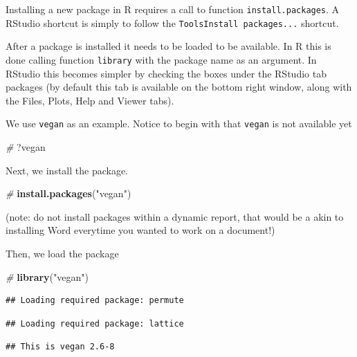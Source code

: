 \documentclass[
]{article}
\newenvironment{Shaded}{\begin{snugshade}}{\end{snugshade}}
\newcommand{\CommentTok}[1]{\textcolor[rgb]{0.56,0.35,0.01}{\textit{#1}}}
\newcommand{\FunctionTok}[1]{\textcolor[rgb]{0.13,0.29,0.53}{\textbf{#1}}}
\newcommand{\NormalTok}[1]{#1}
\newcommand{\StringTok}[1]{\textcolor[rgb]{0.31,0.60,0.02}{#1}}
\begin{document}
Installing a new package in R requires a call to function
\texttt{install.packages}. A RStudio shortcut is simply to follow the
\texttt{Tools\textbar{}Install\ packages...} shortcut.

After a package is installed it needs to be loaded to be available. In R
this is done calling function \texttt{library} with the package name as
an argument. In RStudio this becomes simpler by checking the boxes under
the RStudio tab packages (by default this tab is available on the bottom
right window, along with the Files, Plots, Help and Viewer tabs).

We use \texttt{vegan} as an example. Notice to begin with that
\texttt{vegan} is not available yet

\begin{Shaded}
\begin{Highlighting}[]
\CommentTok{\#}
\NormalTok{?vegan}
\end{Highlighting}
\end{Shaded}

Next, we install the package.

\begin{Shaded}
\begin{Highlighting}[]
\CommentTok{\#}
\FunctionTok{install.packages}\NormalTok{(}\StringTok{"vegan"}\NormalTok{)}
\end{Highlighting}
\end{Shaded}

(note: do not install packages within a dynamic report, that would be a
akin to installing Word everytime you wanted to work on a document!)

Then, we load the package

\begin{Shaded}
\begin{Highlighting}[]
\CommentTok{\#}
\FunctionTok{library}\NormalTok{(}\StringTok{"vegan"}\NormalTok{)}
\end{Highlighting}
\end{Shaded}

\begin{verbatim}
## Loading required package: permute
\end{verbatim}

\begin{verbatim}
## Loading required package: lattice
\end{verbatim}

\begin{verbatim}
## This is vegan 2.6-8
\end{verbatim}
\end{document}
